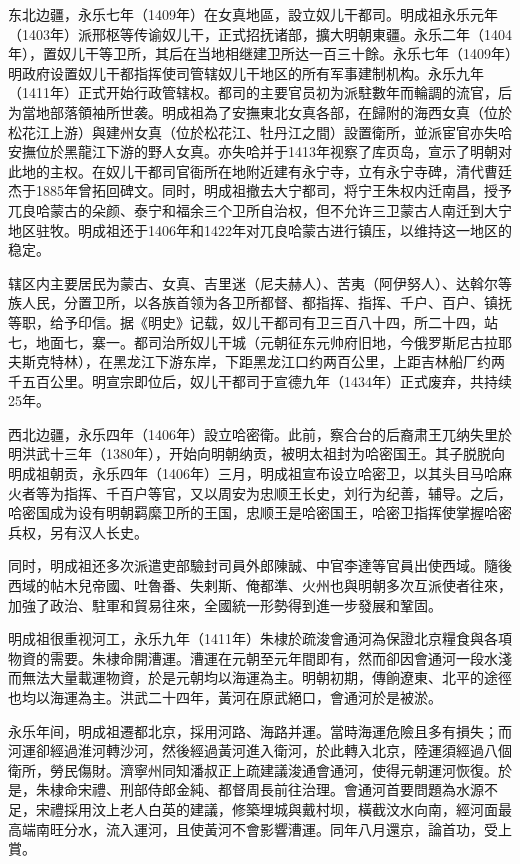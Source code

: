 东北边疆，永乐七年（1409年）在女真地區，設立奴儿干都司。明成祖永乐元年（1403年）派邢枢等传谕奴儿干，正式招抚诸部，擴大明朝東疆。永乐二年（1404年），置奴儿干等卫所，其后在当地相继建卫所达一百三十餘。永乐七年（1409年）明政府设置奴儿干都指挥使司管辖奴儿干地区的所有军事建制机构。永乐九年（1411年）正式开始行政管辖权。都司的主要官员初为派駐數年而輪調的流官，后为當地部落領袖所世袭。明成祖為了安撫東北女真各部，在歸附的海西女真（位於松花江上游）與建州女真（位於松花江、牡丹江之間）設置衛所，並派宦官亦失哈安撫位於黑龍江下游的野人女真。亦失哈并于1413年视察了库页岛，宣示了明朝对此地的主权。在奴儿干都司官衙所在地附近建有永宁寺，立有永宁寺碑，清代曹廷杰于1885年曾拓回碑文。同时，明成祖撤去大宁都司，将宁王朱权内迁南昌，授予兀良哈蒙古的朵颜、泰宁和福余三个卫所自治权，但不允许三卫蒙古人南迁到大宁地区驻牧。明成祖还于1406年和1422年对兀良哈蒙古进行镇压，以维持这一地区的稳定。

辖区内主要居民为蒙古、女真、吉里迷（尼夫赫人）、苦夷（阿伊努人）、达斡尔等族人民，分置卫所，以各族首领为各卫所都督、都指挥、指挥、千户、百户、镇抚等职，给予印信。据《明史》记载，奴儿干都司有卫三百八十四，所二十四，站七，地面七，寨一。都司治所奴儿干城（元朝征东元帅府旧地，今俄罗斯尼古拉耶夫斯克特林），在黑龙江下游东岸，下距黑龙江口约两百公里，上距吉林船厂约两千五百公里。明宣宗即位后，奴儿干都司于宣德九年（1434年）正式废弃，共持续25年。

西北边疆，永乐四年（1406年）設立哈密衛。此前，察合台的后裔肃王兀纳失里於明洪武十三年（1380年），开始向明朝纳贡，被明太祖封为哈密国王。其子脱脱向明成祖朝贡，永乐四年（1406年）三月，明成祖宣布设立哈密卫，以其头目马哈麻火者等为指挥、千百户等官，又以周安为忠顺王长史，刘行为纪善，辅导。之后，哈密国成为设有明朝羁縻卫所的王国，忠顺王是哈密国王，哈密卫指挥使掌握哈密兵权，另有汉人长史。

同时，明成祖还多次派遣吏部驗封司員外郎陳誠、中官李達等官員出使西域。隨後西域的帖木兒帝國、吐魯番、失剌斯、俺都準、火州也與明朝多次互派使者往來，加強了政治、駐軍和貿易往來，全國統一形勢得到進一步發展和鞏固。

明成祖很重视河工，永乐九年（1411年）朱棣於疏浚會通河為保證北京糧食與各項物資的需要。朱棣命開漕運。漕運在元朝至元年間即有，然而卻因會通河一段水淺而無法大量載運物資，於是元朝均以海運為主。明朝初期，傳餉遼東、北平的途徑也均以海運為主。洪武二十四年，黃河在原武絕口，會通河於是被淤。

永乐年间，明成祖遷都北京，採用河路、海路并運。當時海運危險且多有損失；而河運卻經過淮河轉沙河，然後經過黃河進入衛河，於此轉入北京，陸運須經過八個衛所，勞民傷財。濟寧州同知潘叔正上疏建議浚通會通河，使得元朝運河恢復。於是，朱棣命宋禮、刑部侍郎金純、都督周長前往治理。會通河首要問題為水源不足，宋禮採用汶上老人白英的建議，修築埋城與戴村坝，橫截汶水向南，經河面最高端南旺分水，流入運河，且使黃河不會影響漕運。同年八月還京，論首功，受上賞。

